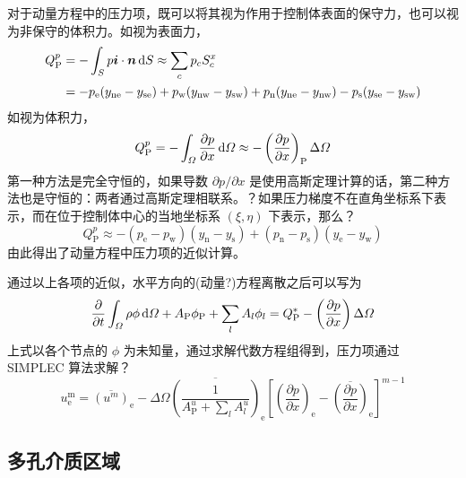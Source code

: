对于动量方程中的压力项，既可以将其视为作用于控制体表面的保守力，也可以视为非保守的体积力。如视为表面力，
\begin{equation}
\begin{split}
	Q_{\mathrm{P}}^p &= -\int_S p\bm{i}\cdot\bm{n}\,\mathrm{d} S \approx
	\sum_c p_cS_c^x \\
	&= -p_{\mathrm{e}}(y_{\mathrm{ne}}-y_{\mathrm{se}}) +
	p_{\mathrm{w}}(y_{\mathrm{nw}}-y_{\mathrm{sw}}) +
	p_{\mathrm{n}}(y_{\mathrm{ne}}-y_{\mathrm{nw}}) -
	p_{\mathrm{s}}(y_{\mathrm{se}}-y_{\mathrm{sw}})
\end{split}
\end{equation}
如视为体积力，
\begin{equation}
	Q_{\mathrm{P}}^p = 
	-\int_{\varOmega} \frac{\partial p}{\partial x} \,\mathrm{d}\varOmega \approx 
	-\left(\frac{\partial p}{\partial x}\right)_{\mathrm{P}} \Delta\varOmega
\end{equation}
第一种方法是完全守恒的，如果导数 $\partial p/\partial x$ 是使用高斯定理计算的话，第二种方法也是守恒的：两者通过高斯定理相联系。？如果压力梯度不在直角坐标系下表示，而在位于控制体中心的当地坐标系 $(\xi,\eta)$ 下表示，那么？
\begin{equation}
	Q_{\mathrm{P}}^p \approx 
	-(p_{\mathrm{e}}-p_{\mathrm{w}})(y_{\mathrm{n}}-y_{\mathrm{s}}) + 
	(p_{\mathrm{n}}-p_{\mathrm{s}})(y_{\mathrm{e}}-y_{\mathrm{w}})
\end{equation}
由此得出了动量方程中压力项的近似计算。

通过以上各项的近似，水平方向的(动量?)方程离散之后可以写为
\begin{equation}
	\frac{\partial}{\partial t}\int_{\varOmega}\rho\phi\,\mathrm{d}\varOmega +
	A_{\mathrm{P}}\phi_{\mathrm{P}} + \sum_l A_l\phi_l = Q_{\mathrm{P}}^* - \left(\frac{\partial p}{\partial x}\right) \Delta\varOmega
\end{equation}
上式以各个节点的 $\phi$ 为未知量，通过求解代数方程组得到，压力项通过 SIMPLEC 算法求解？\cite{}
\begin{equation}\label{eq: Simplec}
	u_{\mathrm{e}}^{\mathrm{m}} = \overline{(u^m)}_{\mathrm{e}} - \Delta\varOmega \overline{\left(\frac{1}{A_{\mathrm{P}}^u+\sum_lA_l^u}\right)}_{\mathrm{e}} \left[\left(\frac{\partial p}{\partial x}\right)_{\mathrm{e}}-\overline{\left(\frac{\partial p}{\partial x}\right)}_{\mathrm{e}}\right]^{m-1}
\end{equation}

\subsection{多孔介质区域}

